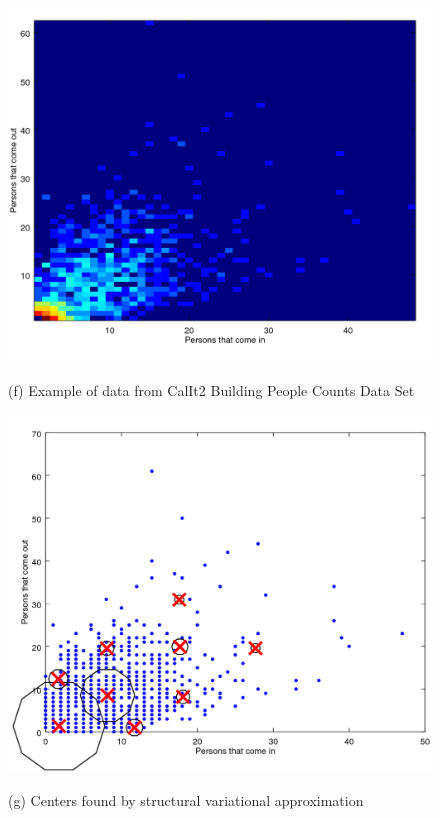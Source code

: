 \documentclass[10pt,a4paper]{report}
\begin{document}
\begin{figure}[h]
	\begin{minipage}[b]{.48\linewidth}
		\vspace{10pt}
		\includegraphics[width=1.0\textwidth]{building.png}
		\begin{center}
			\large{(f) Example of data from CalIt2 
			Building People Counts Data Set}
		\end{center}\medskip
	\end{minipage}
	\hfill
	\begin{minipage}[b]{0.48\linewidth}
		\includegraphics[width=1.0\textwidth]{expe4.png}
		\begin{center}
			\large{(g) Centers found by structural
				variational approximation}
			\end{center}\medskip
	\end{minipage}
	\label{fig:f}
\end{figure}
\end{document}
